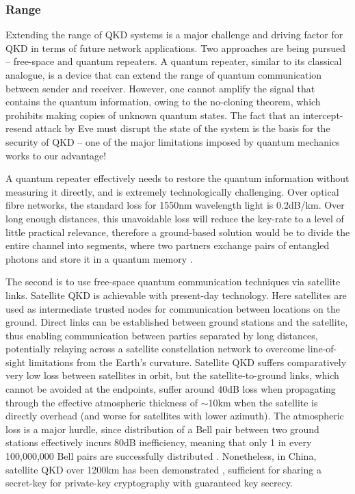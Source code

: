 \subsubsection{Range}

Extending the range of QKD systems is a major challenge and driving factor for QKD in terms of future network applications. Two approaches are being pursued -- free-space and quantum repeaters. A quantum repeater, similar to its classical analogue, is a device that can extend the range of quantum communication between sender and receiver. However, one cannot amplify the signal that contains the quantum information, owing to the no-cloning theorem, which prohibits making copies of unknown quantum states. The fact that an intercept-resend attack by Eve must disrupt the state of the system is the basis for the security of QKD -- one of the major limitations imposed by quantum mechanics works to our advantage!

A quantum repeater effectively needs to restore the quantum information without measuring it directly, and is extremely technologically challenging. Over optical fibre networks, the standard loss for 1550nm wavelength light is 0.2dB/km. Over long enough distances, this unavoidable loss will reduce the key-rate to a level of little practical relevance, therefore a ground-based solution would be to divide the entire channel into segments, where two partners exchange pairs of entangled photons and store it in a quantum memory \cite{bib:BDCZ98, bib:dur98}.

The second is to use free-space quantum communication techniques via satellite links. Satellite QKD is achievable with present-day technology. Here satellites are used as intermediate trusted nodes for communication between locations on the ground. Direct links can be established between ground stations and the satellite, thus enabling communication between parties separated by long distances, potentially relaying across a satellite constellation network to overcome line-of-sight limitations from the Earth's curvature. Satellite QKD suffers comparatively very low loss between satellites in orbit, but the satellite-to-ground links, which cannot be avoided at the endpoints, suffer around 40dB loss when propagating through the effective atmospheric thickness of $\sim$10km when the satellite is directly overhead (and worse for satellites with lower azimuth). The atmospheric loss is a major hurdle, since distribution of a Bell pair between two ground stations effectively incurs 80dB inefficiency, meaning that only 1 in every 100,000,000 Bell pairs are successfully distributed . Nonetheless, in China, satellite QKD over 1200km has been demonstrated \cite{bib:liao2017satellite}, sufficient for sharing a secret-key for private-key cryptography with guaranteed key secrecy.

